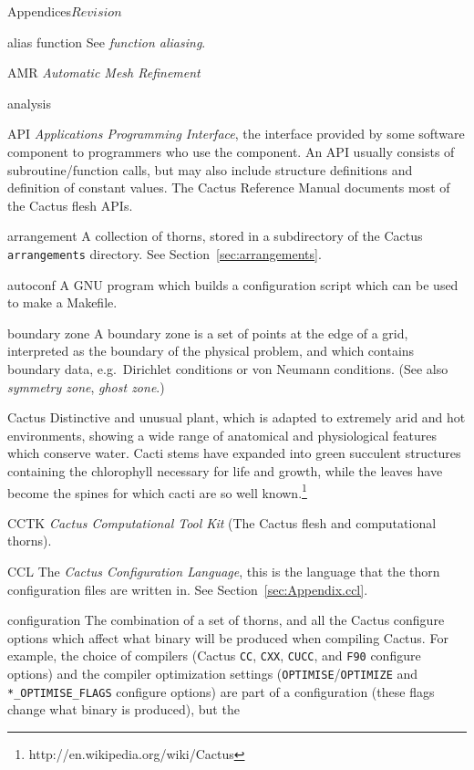 \begin{cactuspart}{Appendices}{}{$Revision$}
\begin{Lentry}
\item[alias function]
  See \textit{function aliasing}.
\item[AMR]
  \textit{Automatic Mesh Refinement}
\item[analysis]
\item[API]
  \textit{Applications Programming Interface}, the interface provided by
  some software component to programmers who use the component. 
  An API usually consists of subroutine/function calls, but may also include
  structure definitions and definition of constant values.
  The Cactus Reference Manual documents most of the Cactus flesh APIs.
\item[arrangement]
  A collection of thorns, stored in a subdirectory of the Cactus
  \verb|arrangements| directory.  See Section~\ref{sec:arrangements}.
\item[autoconf]
  A GNU program which builds a configuration script which can be used
  to make a Makefile.
\item[boundary zone]
  A boundary zone is a set of points at the edge of a grid, interpreted as
  the boundary of the physical problem, and which contains boundary data,
  e.g.\ Dirichlet conditions or von Neumann conditions.
  (See also \textit{symmetry zone}, \textit{ghost zone}.)
\item[Cactus]
Distinctive and unusual plant, which is adapted to extremely arid and hot environments, showing a wide range of anatomical and physiological features which conserve water. Cacti stems have expanded into green succulent structures containing the chlorophyll necessary for life and growth, while the leaves have become the spines for which cacti are so well known.\footnote{%
http://en.wikipedia.org/wiki/Cactus
       }%
\item[CCTK]
  \textit{Cactus Computational Tool Kit} (The Cactus flesh and computational
  thorns).
\item[CCL]
  The \textit{Cactus Configuration Language}, this is the language that
  the thorn configuration files are written in.
  See Section~\ref{sec:Appendix.ccl}.
\item[configuration]
  The combination of a set of thorns, and all the Cactus configure
  options which affect what binary will be produced when compiling
  Cactus.  For example, the choice of compilers (Cactus \verb|CC|,
  \verb|CXX|, \verb|CUCC|, and \verb|F90| configure options) and the
  compiler optimization settings (\verb|OPTIMISE|/\verb|OPTIMIZE| and
  \verb|*_OPTIMISE_FLAGS| configure options) are part of a
  configuration (these flags change what binary is produced), but the

\end{Lentry}
\end{cactuspart}
